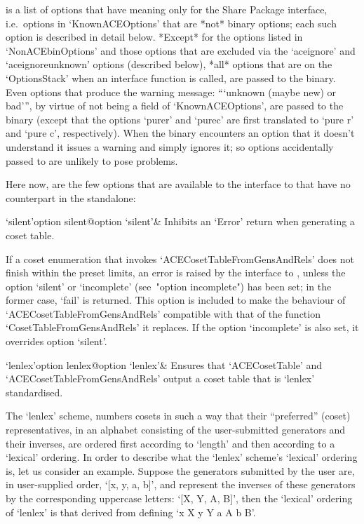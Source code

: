 is a {\GAP} list of options that have  meaning  only  for  the  {\ACE}
Share Package interface, i.e.~options in  `KnownACEOptions'  that  are
*not* {\ACE} binary options; each such option is described  in  detail
below. *Except* for the options listed in `NonACEbinOptions' and those
options that are excluded via the `aceignore'  and  `aceignoreunknown'
options  (described  below),   *all*   options   that   are   on   the
`OptionsStack' when an {\ACE} interface function is called, are passed
to the {\ACE} binary. Even options that produce the  warning  message:
```unknown (maybe new) or bad''', by virtue of not being  a  field  of
`KnownACEOptions', are passed to the {\ACE} binary  (except  that  the
options `purer' and `purec' are first translated to `pure r' and `pure
c', respectively). When the {\ACE} binary encounters an option that it
doesn't understand it issues a  warning  and  simply  ignores  it;  so
options accidentally passed to {\ACE} are unlikely to pose problems.

Here now, are the  few  options  that  are  available  to  the  {\GAP}
interface to {\ACE} that have no counterpart in the {\ACE} standalone:

\beginitems

\>`silent'{option silent}@{option `silent'}& 
Inhibits an `Error' return when generating a coset table.

If a coset  enumeration  that  invokes  `ACECosetTableFromGensAndRels'
does not finish within the preset limits, an error is  raised  by  the
interface to  {\GAP},  unless  the  option  `silent'  or  `incomplete'
(see~"option incomplete") has been set; in the former case, `fail'  is
returned.  This  option  is  included  to  make   the   behaviour   of
`ACECosetTableFromGensAndRels' compatible with that  of  the  function
`CosetTableFromGensAndRels' it replaces. If the option `incomplete' is
also set, it overrides option `silent'.

\>`lenlex'{option lenlex}@{option `lenlex'}& 
Ensures that `ACECosetTable' and `ACECosetTableFromGensAndRels' output
a coset table that is `lenlex' standardised.

The  `lenlex'  scheme,  numbers  cosets  in  such  a  way  that  their
``preferred'' (coset) representatives, in an  alphabet  consisting  of
the user-submitted generators and their inverses,  are  ordered  first
according to `length' and then according to a `lexical'  ordering.  In
order to describe what the `lenlex' scheme's  `lexical'  ordering  is,
let us consider an example. Suppose the generators  submitted  by  the
user are, in user-supplied order, `[x, y, a, b]',  and  represent  the
inverses of these generators by the corresponding  uppercase  letters:
`[X, Y, A, B]', then  the  `lexical'  ordering  of  `lenlex'  is  that
derived from defining `x \< X \< y \< Y \< a \< A \< b \< B'.

